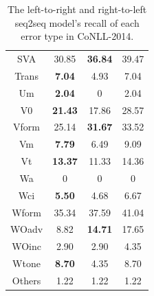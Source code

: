 \documentclass{article} %
\begin{document}
\begin{table}[t]
\begin{tabular}{c|c|c|c}
SVA                 & 30.85                  & \textbf{36.84}         & 39.47                                                          \\
Trans               & \textbf{7.04}          & 4.93                   & 7.04                                                           \\
Um                  & \textbf{2.04}          & 0                      & 2.04                                                           \\
V0                  & \textbf{21.43}         & 17.86                  & 28.57                                                          \\
Vform               & 25.14                  & \textbf{31.67}         & 33.52                                                          \\
Vm                  & \textbf{7.79}          & 6.49                   & 9.09                                                           \\
Vt                  & \textbf{13.37}         & 11.33                  & 14.36                                                          \\
Wa                  & 0                      & 0                      & 0                                                              \\
Wci                 & \textbf{5.50}          & 4.68                   & 6.67                                                           \\
Wform               & 35.34                  & 37.59                  & 41.04                                                          \\
WOadv               & 8.82                   & \textbf{14.71}         & 17.65                                                          \\
WOinc               & 2.90                   & 2.90                   & 4.35                                                           \\
Wtone               & \textbf{8.70}          & 4.35                   & 8.70                                                           \\
Others              & 1.22                   & 1.22                   & 1.22                                                          \\ \hline
\end{tabular}
\caption{The left-to-right and right-to-left seq2seq model's recall of each error type in CoNLL-2014.}\vspace{-0.1cm}
\label{tab:errortype}
\end{table}
\end{document}
